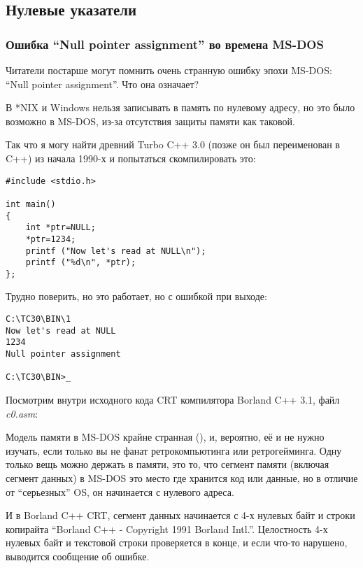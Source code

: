 \subsection{Нулевые указатели}

\subsubsection{Ошибка ``Null pointer assignment'' во времена MS-DOS}

Читатели постарше могут помнить очень странную ошибку эпохи MS-DOS: ``Null pointer assignment''.
Что она означает?

В *NIX и Windows нельзя записывать в память по нулевому адресу, но это было возможно в MS-DOS, из-за отсутствия
защиты памяти как таковой.

Так что я могу найти древний Turbo C++ 3.0 (позже он был переименован в C++) из начала 1990-х и попытаться
скомпилировать это:

\begin{lstlisting}[style=customc]
#include <stdio.h>

int main()
{
	int *ptr=NULL;
	*ptr=1234;
	printf ("Now let's read at NULL\n");
	printf ("%d\n", *ptr);
};
\end{lstlisting}

Трудно поверить, но это работает, но с ошибкой при выходе:

\begin{lstlisting}[caption=Древний Turbo C++ 3.0]
C:\TC30\BIN\1
Now let's read at NULL
1234
Null pointer assignment

C:\TC30\BIN>_
\end{lstlisting}

Посмотрим внутри исходного кода \ac{CRT} компилятора Borland C++ 3.1, файл \emph{c0.asm}:



Модель памяти в MS-DOS крайне странная (), и, вероятно, её и не нужно изучать, если только вы не фанат ретрокомпьютинга
или ретрогейминга.
Одну только вещь можно держать в памяти, это то, что сегмент памяти (включая сегмент данных) в MS-DOS это место где
хранится код или данные, но в отличие от ``серьезных'' \ac{OS}, он начинается с нулевого адреса.

И в Borland C++ \ac{CRT}, сегмент данных начинается с 4-х нулевых байт и строки копирайта
``Borland C++ - Copyright 1991 Borland Intl.''.
Целостность 4-х нулевых байт и текстовой строки проверяется в конце, и если что-то нарушено, выводится сообщение об ошибке.

